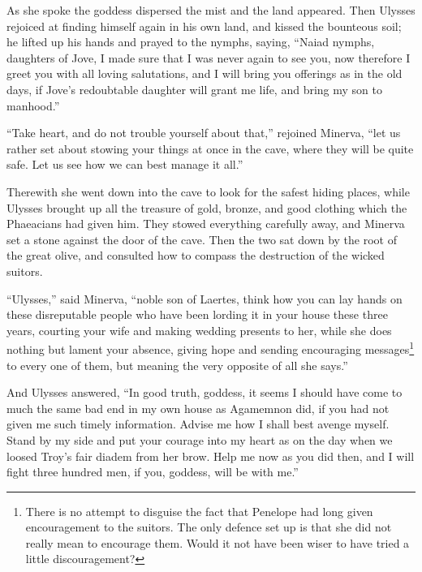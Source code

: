As she spoke the goddess dispersed the mist and the land appeared. Then Ulysses
rejoiced at finding himself again in his own land, and kissed the bounteous
soil; he lifted up his hands and prayed to the nymphs, saying, “Naiad nymphs,
daughters of Jove, I made sure that I was never again to see you, now therefore
I greet you with all loving salutations, and I will bring you offerings as in
the old days, if Jove’s redoubtable daughter will grant me life, and bring my
son to manhood.”

“Take heart, and do not trouble yourself about that,” rejoined Minerva, “let us
rather set about stowing your things at once in the cave, where they will be
quite safe. Let us see how we can best manage it all.”

Therewith she went down into the cave to look for the safest hiding places,
while Ulysses brought up all the treasure of gold, bronze, and good clothing
which the Phaeacians had given him. They stowed everything carefully away, and
Minerva set a stone against the door of the cave. Then the two sat down by the
root of the great olive, and consulted how to compass the destruction of the
wicked suitors.

“Ulysses,” said Minerva, “noble son of Laertes, think how you can lay hands on
these disreputable people who have been lording it in your house these three
years, courting your wife and making wedding presents to her, while she does
nothing but lament your absence, giving hope and sending encouraging messages\footnote{There is no attempt to disguise the fact that Penelope had long given
encouragement to the suitors. The only defence set up is that she did not
really mean to encourage them. Would it not have been wiser to have tried a
little discouragement?} to every one
of them, but meaning the very opposite of all she says.”

And Ulysses answered, “In good truth, goddess, it seems I should have come to
much the same bad end in my own house as Agamemnon did, if you had not given me
such timely information. Advise me how I shall best avenge myself. Stand by my
side and put your courage into my heart as on the day when we loosed Troy’s
fair diadem from her brow. Help me now as you did then, and I will fight three
hundred men, if you, goddess, will be with me.”

